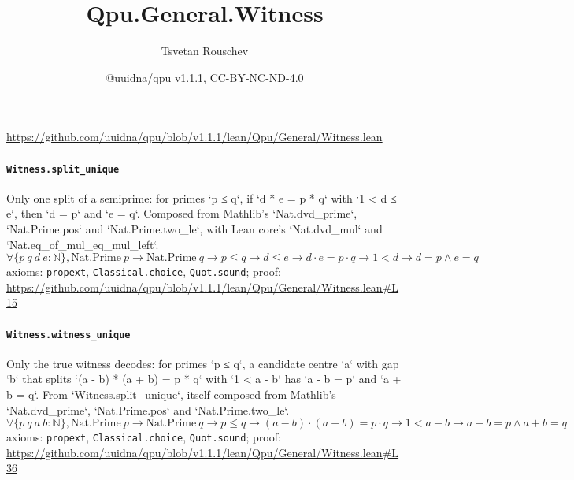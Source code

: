 \documentclass[11pt]{article}
\title{Qpu.General.Witness}
\author{Tsvetan Rouschev}
\date{@uuidna/qpu v1.1.1, CC-BY-NC-ND-4.0}
\begin{document}
\maketitle
\noindent\url{https://github.com/uuidna/qpu/blob/v1.1.1/lean/Qpu/General/Witness.lean}

\paragraph{\texttt{Witness.split\_unique}}
Only one split of a semiprime: for primes `p ≤ q`, if `d * e = p * q` with `1 < d ≤ e`, then `d = p` and `e = q`. Composed from Mathlib's `Nat.dvd\_prime`, `Nat.Prime.pos` and `Nat.Prime.two\_le`, with Lean core's `Nat.dvd\_mul` and `Nat.eq\_of\_mul\_eq\_mul\_left`.
\[ \forall \{p\ q\ d\ e : \mathbb{N}\}, \mathrm{Nat.Prime}\ p \to \mathrm{Nat.Prime}\ q \to p \le q \to d \le e \to d \cdot e = p \cdot q \to 1 < d \to d = p \land e = q \]
\noindent axioms: \texttt{propext}, \texttt{Classical.choice}, \texttt{Quot.sound}; proof: \url{https://github.com/uuidna/qpu/blob/v1.1.1/lean/Qpu/General/Witness.lean\#L15}

\paragraph{\texttt{Witness.witness\_unique}}
Only the true witness decodes: for primes `p ≤ q`, a candidate centre `a` with gap `b` that splits `(a - b) * (a + b) = p * q` with `1 < a - b` has `a - b = p` and `a + b = q`. From `Witness.split\_unique`, itself composed from Mathlib's `Nat.dvd\_prime`, `Nat.Prime.pos` and `Nat.Prime.two\_le`.
\[ \forall \{p\ q\ a\ b : \mathbb{N}\}, \mathrm{Nat.Prime}\ p \to \mathrm{Nat.Prime}\ q \to p \le q \to (a - b) \cdot (a + b) = p \cdot q \to 1 < a - b \to a - b = p \land a + b = q \]
\noindent axioms: \texttt{propext}, \texttt{Classical.choice}, \texttt{Quot.sound}; proof: \url{https://github.com/uuidna/qpu/blob/v1.1.1/lean/Qpu/General/Witness.lean\#L36}
\end{document}

